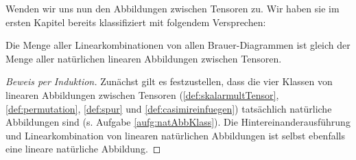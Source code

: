 Wenden wir uns nun den Abbildungen zwischen Tensoren zu. Wir haben sie im ersten Kapitel bereits klassifiziert mit folgendem Versprechen:
\begin{lemma}
	\label{bem:Brauer}
	Die Menge aller Linearkombinationen von allen Brauer-Diagrammen ist gleich der Menge aller natürlichen linearen Abbildungen zwischen Tensoren.
\end{lemma}
\begin{proof}[Beweis per Induktion]
Zunächst gilt es festzustellen, dass die vier Klassen von linearen Abbildungen zwischen Tensoren (\ref{def:skalarmultTensor}, \ref{def:permutation}, \ref{def:spur} und \ref{def:casimireinfuegen}) tatsächlich natürliche Abbildungen sind (s. Aufgabe \ref{aufg:natAbbKlass}).
Die Hintereinanderausführung und Linearkombination von linearen natürlichen Abbildungen ist selbst ebenfalls eine lineare natürliche Abbildung. 
 

\end{proof}
